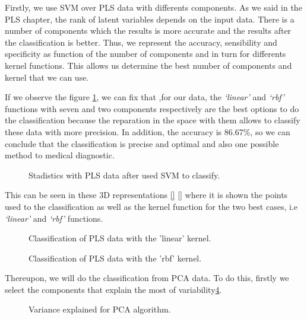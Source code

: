Firstly, we use SVM over PLS data with differents components. As we said in the PLS chapter, the rank of latent variables depends on the input data. There is a number of components which the results is more accurate and the results after the classification is better. Thus, we represent the accuracy, sensibility and specificity as function of the number of components and in turn for differents kernel functions. This allows us determine the best number of components and  kernel that we can use.

If we observe the figure \ref{fig:stadistics_PLS}, we can fix that ,for our data, the \textit{‘linear’} and \textit{‘rbf’} functions with seven and two components respectively are the best options to do the classification because the reparation in the space with them allows to classify these data with more precision.  In addition, the accuracy is 86.67\%, so we can conclude that the classification is precise and optimal and also one possible method to medical diagnostic.

\begin{figure}[H]
	\centering
	\caption{Stadistics with PLS data after used SVM to classify.}
	\label{fig:stadistics_PLS}
\end{figure}

This can be seen in these 3D representations \ref{} \ref{} where it is shown the points used to the classification as well as the kernel function for the two best cases, i.e \textit{‘linear’} and \textit{‘rbf’} functions.

\begin{figure}[H]
	\centering
	\caption{Classification of PLS data with the 'linear' kernel.}
	\label{fig:Classification3D_PLS_linear}
\end{figure}

\begin{figure}[H]
	\centering
	\caption{Classification of PLS data with the 'rbf' kernel.}
	\label{fig:Classification3D_PLS_rbf}
\end{figure}

Thereupon, we will do the classification from PCA data. To do this, firstly we select the components that explain the most of variability\ref{fig:variance_PCA}.

\begin{figure}[H]
	\centering
	\caption{Variance explained for PCA algorithm.}
	\label{fig:variance_PCA}
\end{figure} 

